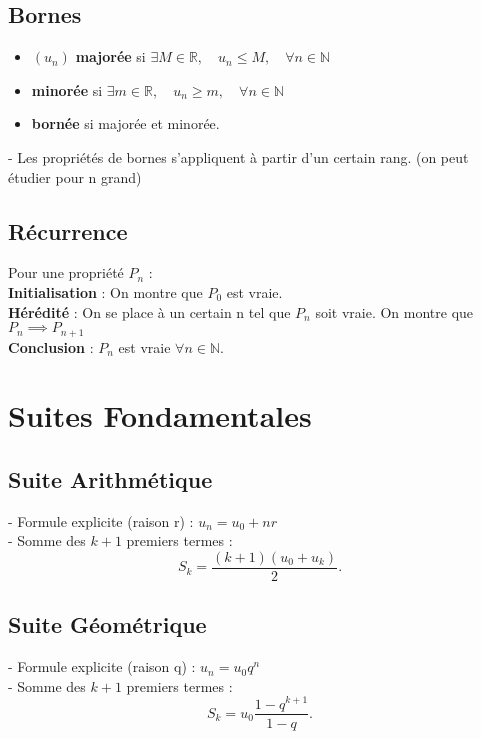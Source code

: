 \documentclass[a4paper,10pt]{article}
\begin{document}
\subsection*{Bornes}
\begin{itemize}
	\item \((u_n)\) \textbf{majorée} si \(\exists M \in \mathbb{R}, \quad u_n \leq M, \quad \forall n \in \mathbb{N}\)
    
	\item \textbf{minorée} si \(\exists m \in \mathbb{R}, \quad u_n \geq m, \quad \forall n \in \mathbb{N}\)
    
	\item \textbf{bornée} si majorée et minorée.
\end{itemize}

- Les propriétés de bornes s'appliquent à partir d'un certain rang. (on peut étudier pour n grand)

\subsection*{Récurrence}
Pour une propriété \( P_n \) :\\ \textbf{Initialisation} : On montre que \( P_0 \) est vraie. \\
\textbf{Hérédité} : On se place à un certain n tel que \( P_n \) soit vraie. On montre que \( P_n \implies P_{n+1} \) \\\textbf{Conclusion} : \( P_n \) est vraie \(\forall n \in \mathbb{N}\).



\section*{Suites Fondamentales}

\subsection*{Suite Arithmétique}
- Formule explicite (raison r) : \( u_n = u_0 + nr \) \\
- Somme des \( k + 1 \) premiers termes :
  \[
  S_k = \frac{(k+1)(u_0 + u_k)}{2}.
  \]

\subsection*{Suite Géométrique}
- Formule explicite (raison q) : \( u_n = u_0 q^n \) \\
- Somme des \( k + 1 \) premiers termes :
  \[
  S_k = u_0 \frac{1 - q^{k+1}}{1 - q}.
  \]
\end{document}
